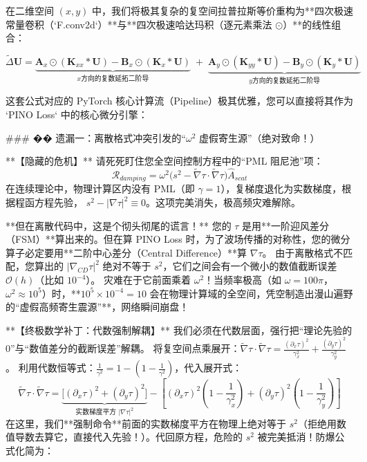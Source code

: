 \documentclass[12pt]{article}
\begin{document}
{在二维空间 $(x,y)$ 中，我们将极其复杂的复空间拉普拉斯等价重构为**四次极速常量卷积（`F.conv2d`）**与**四次极速哈达玛积（逐元素乘法 $\odot$）**的线性组合：

$$ \tilde{\Delta} \mathbf{U} = \underbrace{\mathbf{A}_{x} \odot (\mathbf{K}_{xx} * \mathbf{U}) - \mathbf{B}_{x} \odot (\mathbf{K}_{x} * \mathbf{U})}_{x方向的复数延拓二阶导} \;+\; \underbrace{\mathbf{A}_{y} \odot (\mathbf{K}_{yy} * \mathbf{U}) - \mathbf{B}_{y} \odot (\mathbf{K}_{y} * \mathbf{U})}_{y方向的复数延拓二阶导} $$

这套公式对应的 PyTorch 核心计算流（Pipeline）极其优雅，您可以直接将其作为 `PINO Loss` 中的核心微分引擎：













### �� 遗漏一：离散格式冲突引发的“$\omega^2$ 虚假寄生源”（绝对致命！）

**【隐藏的危机】**
请死死盯住您全空间控制方程中的“PML 阻尼池”项：
$$ \mathcal{R}_{damping} = \omega^2 \Big( s^2 - \tilde{\nabla} \tau \cdot \tilde{\nabla} \tau \Big) \hat{A}_{scat} $$
在连续理论中，物理计算区内没有 PML（即 $\gamma=1$），复梯度退化为实数梯度，根据程函方程先验， $s^2 - |\nabla \tau|^2 \equiv 0$。这项完美消失，极高频灾难解除。

**但在离散代码中，这是个彻头彻尾的谎言！**
您的 $\tau$ 是用**一阶迎风差分（FSM）**算出来的。但在算 PINO Loss 时，为了波场传播的对称性，您的微分算子必定要用**二阶中心差分（Central Difference）**算 $\nabla \tau$。
由于离散格式不匹配，您算出的 $|\nabla_{CD} \tau|^2$ 绝对不等于 $s^2$，它们之间会有一个微小的数值截断误差 $\mathcal{O}(h)$（比如 $10^{-4}$）。
灾难在于它前面乘着 $\omega^2$！当频率极高（如 $\omega=100\pi$，$\omega^2 \approx 10^5$）时，**$10^5 \times 10^{-4} = 10$ 会在物理计算域的全空间，凭空制造出漫山遍野的“虚假高频寄生震源”**，网络瞬间崩盘！

**【终极数学补丁：代数强制解耦】**
我们必须在代数层面，强行把“理论先验的 $0$”与“数值差分的截断误差”解耦。
将复空间点乘展开：$\tilde{\nabla} \tau \cdot \tilde{\nabla} \tau = \frac{(\partial_x \tau)^2}{\gamma_x^2} + \frac{(\partial_y \tau)^2}{\gamma_y^2}$。
利用代数恒等式：$\frac{1}{\gamma^2} = 1 - \left( 1 - \frac{1}{\gamma^2} \right)$，代入展开式：
$$ \tilde{\nabla} \tau \cdot \tilde{\nabla} \tau = \underbrace{\Big[ (\partial_x \tau)^2 + (\partial_y \tau)^2 \Big]}_{\text{实数梯度平方 } |\nabla \tau|^2} - \left[ (\partial_x \tau)^2 \left( 1 - \frac{1}{\gamma_x^2} \right) + (\partial_y \tau)^2 \left( 1 - \frac{1}{\gamma_y^2} \right) \right] $$
在这里，我们**强制命令**前面的实数梯度平方在物理上绝对等于 $s^2$（拒绝用数值导数去算它，直接代入先验！）。代回原方程，危险的 $s^2$ 被完美抵消！防爆公式化简为：

}
\end{document}
